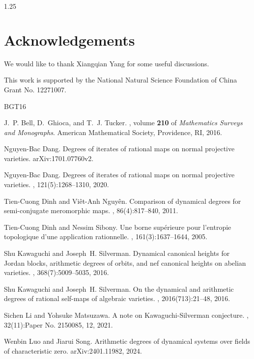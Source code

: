\documentclass[12pt]{amsart}
\begin{document}
\begin{spacing}{1.25}
\section*{Acknowledgements}
We would like to thank Xiangqian Yang for some useful discussions.

This work is supported by the National Natural Science Foundation of China Grant No. 12271007.




\begin{thebibliography}{BGT16}

J.~P. Bell, D.~Ghioca, and T.~J. Tucker.
, volume \textbf{210} of
  {\em Mathematics Surveys and Monographs}.
\newblock American Mathematical Society, Providence, RI, 2016.

Nguyen-Bac Dang.
\newblock Degrees of iterates of rational maps on normal projective varieties.
\newblock arXiv:1701.07760v2.

Nguyen-Bac Dang.
\newblock Degrees of iterates of rational maps on normal projective varieties.
, 121(5):1268--1310, 2020.

Tien-Cuong Dinh and Vi\^et-Anh Nguy\^en.
\newblock Comparison of dynamical degrees for semi-conjugate meromorphic maps.
, 86(4):817--840, 2011.

Tien-Cuong Dinh and Nessim Sibony.
\newblock Une borne sup\'erieure pour l'entropie topologique d'une application
  rationnelle.
, 161(3):1637--1644, 2005.

Shu Kawaguchi and Joseph~H. Silverman.
\newblock Dynamical canonical heights for {J}ordan blocks, arithmetic degrees
  of orbits, and nef canonical heights on abelian varieties.
, 368(7):5009--5035, 2016.

Shu Kawaguchi and Joseph~H. Silverman.
\newblock On the dynamical and arithmetic degrees of rational self-maps of
  algebraic varieties.
, 2016(713):21--48, 2016.

Sichen Li and Yohsuke Matsuzawa.
\newblock A note on {K}awaguchi-{S}ilverman conjecture.
, 32(11):Paper No. 2150085, 12, 2021.

Wenbin Luo and Jiarui Song.
\newblock Arithmetic degrees of dynamical systems over fields of characteristic
  zero.
\newblock arXiv:2401.11982, 2024.


\end{thebibliography}
\end{spacing}
\end{document}
